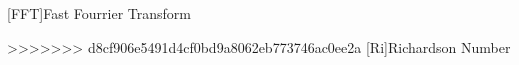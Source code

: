 \begin{acronym}
[FFT]{Fast Fourrier Transform}
\end{acronym}


\begin{acronym}
>>>>>>> d8cf906e5491d4cf0bd9a8062eb773746ac0ee2a
[Ri]{Richardson Number 
}
\end{acronym}


\endinput




% 
